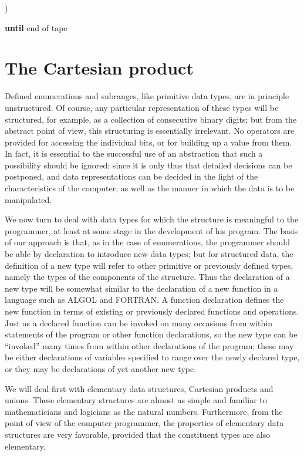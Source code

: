 \quad)

\textbf{until} end of tape

\section{The Cartesian product}

Defined enumerations and subranges, like primitive data types, are in principle unstructured. Of course, any particular representation of these types will be structured, for example, as a collection of consecutive binary digits; but from the abstract point of view, this structuring is essentially irrelevant. No operators are provided for accessing the individual bits, or for building up a value from them. In fact, it is essential to the successful use of an abstraction that such a possibility should be ignored; since it is only thus that detailed decisions can be postponed, and data representations can be decided in the light of the characteristics of the computer, as well as the manner in which the data is to be manipulated.

We now turn to deal with data types for which the structure is meaningful to the programmer, at least at some stage in the development of his program. The basis of our approach is that, as in the case of enumerations, the programmer should be able by declaration to introduce new data types; but for structured data, the definition of a new type will refer to other primitive or previously defined types, namely the types of the components of the structure. Thus the declaration of a new type will be somewhat similar to the declaration of a new function in a language such as ALGOL and FORTRAN. A function declaration defines the new function in terms of existing or previously declared functions and operations. Just as a declared function can be invoked on many occasions from within statements of the program or other function declarations, so the new type can be ``invoked'' many times from within other declarations of the program; these may be either declarations of variables specified to range over the newly declared type, or they may be declarations of yet another new type.

We will deal first with elementary data structures, Cartesian products and unions. These elementary structures are almost as simple and familiar to mathematicians and logicians as the natural numbers. Furthermore, from the point of view of the computer programmer, the properties of elementary data structures are very favorable, provided that the constituent types are also elementary.

